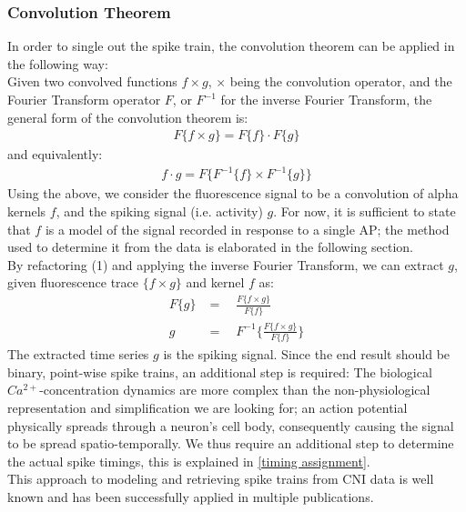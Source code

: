 \documentclass[titlepage]{article}
\begin{document}
\subsubsection{Convolution Theorem}\label{convolution}
In order to single out the spike train, the convolution theorem can be applied in the following way:\\
Given two convolved functions $f\times g$, $\times$ being the convolution operator, and the Fourier Transform operator $F$, or $F^{-1}$ for the inverse Fourier Transform, the general form of the convolution theorem is\cite{arndt_pi:_2013}:
\begin{align}
F\{f\times g\}  = F\{f\}\cdot  F\{g\}
\end{align}  
and equivalently:
\begin{align}
f \cdot g = F\{F^{-1}\{f\}\times F^{-1}\{g\}\}
\end{align}
Using the above, we consider the fluorescence signal to be a convolution of alpha kernels $f$, and the spiking signal (i.e. activity) $g$. For now, it is sufficient to state that $f$ is a model of the signal recorded in response to a single AP; the method used to determine it from the data is elaborated in the following section.\\
By refactoring (1) and applying the inverse Fourier Transform, we can extract $g$, given fluorescence trace $\{f\times g\}$ and kernel $f$ as:
\begin{align}
F\{g\} & = \quad \frac{F\{f\times g\}} {F\{f\}}\\
g & = \quad F^{-1} \{\frac{F\{f\times g\} }{F\{f\}} \}
\end{align}
The extracted time series $g$ is the spiking signal. Since the end result should be binary, point-wise spike trains, an additional step is required: The biological $Ca^{2+}$-concentration dynamics are more complex than the non-physiological representation and simplification we are looking for; an action potential physically spreads through a neuron's cell body, consequently causing the signal to be spread spatio-temporally. We thus require an additional step to determine the actual spike timings, this is explained in \ref{timing assignment}.\\
This approach to modeling and retrieving spike trains from CNI data is well known and has been successfully applied in multiple publications\cite{dombeck_imaging_2007}\cite{yaksi_reconstruction_2006}.
\end{document}
